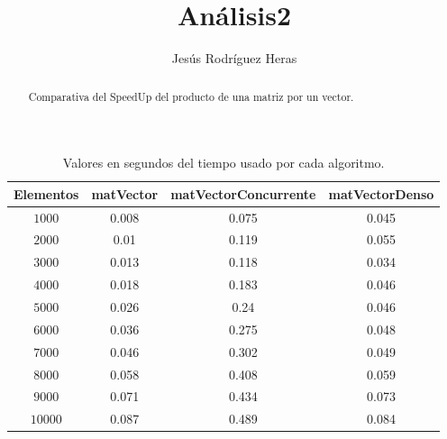 \documentclass[12pt,letterpaper]{article}
\title{Análisis2}
\author{Jesús Rodríguez Heras}
\begin{document}
	
	\maketitle
	\begin{abstract} %
		\begin{center}
			Comparativa del SpeedUp del producto de una matriz por un vector.
		\end{center}
	\end{abstract}
	\thispagestyle{empty}
	\newpage
	
	\newpage
	
	
	
	
	\lstset{language=bash, numbers=left, numberstyle=\tiny, numbersep=10pt, firstnumber=1, stepnumber=1, basicstyle=\small\ttfamily, tabsize=1, extendedchars=true, inputencoding=latin1}

\begin{center}
	\begin{table}[htbp]
		\begin{center}
			\begin{tabular}{|c|c|c|c|}
				\hline
				\textbf{Elementos} & \textbf{matVector} & \textbf{matVectorConcurrente} & \textbf{matVectorDenso}  \\
				\hline 
				$1000$ & 0.008 & 0.075 & 0.045 \\ \hline 
				$2000$ & 0.01 & 0.119 & 0.055 \\ \hline  
				$3000$ & 0.013 & 0.118 & 0.034 \\ \hline 
				$4000$ & 0.018 & 0.183 & 0.046 \\ \hline 
				$5000$ & 0.026 & 0.24 & 0.046 \\ \hline  
				$6000$ & 0.036 & 0.275 & 0.048 \\ \hline 
				$7000$ & 0.046 & 0.302 & 0.049 \\ \hline 
				$8000$ & 0.058 & 0.408 & 0.059 \\ \hline 
				$9000$ & 0.071 & 0.434 & 0.073 \\ \hline 
				$10000$ & 0.087 & 0.489 & 0.084 \\ \hline
			\end{tabular}
			\caption{Valores en segundos del tiempo usado por cada algoritmo.}
			\label{tabla:Valores en segundos del tiempo usado por cada algoritmo}
		\end{center}
	\end{table}
\end{center}
\end{document}
